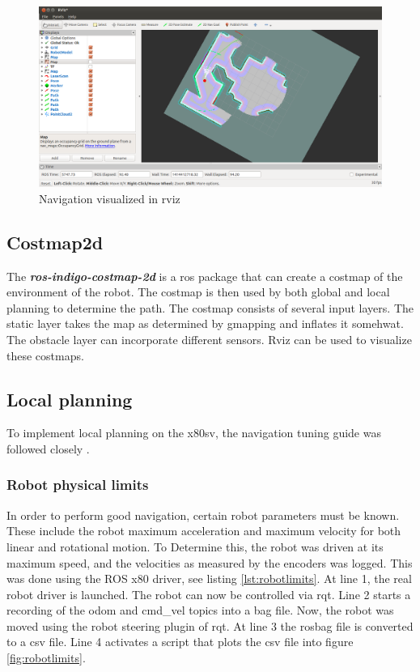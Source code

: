 \documentclass[a4paper]{article}
\newcommand{\rospackage}[1]{\textbf{\textit{ros-indigo-#1}}}
\begin{document}
\begin{figure}[h!]
  \centering
  \includegraphics[width=\textwidth,height=\textheight,keepaspectratio]{img/rviz_navigation2.png}
  \caption{Navigation visualized in rviz}
  \label{fig:navrviz}
\end{figure}

\subsection{Costmap2d}
The \rospackage{costmap-2d} is a ros package that can create a costmap of the environment
of the robot.
The costmap is then used by both global and local planning to determine the path.
The costmap consists of several input layers. The static layer takes the map as determined by
gmapping and inflates it somehwat. The obstacle layer can incorporate different sensors.
Rviz can be used to visualize these costmaps.

\subsection{Local planning}
To implement local planning on the x80sv, the navigation tuning guide was followed closely
\cite{tuningguide}.

\subsubsection{Robot physical limits}
In order to perform good navigation, certain robot parameters must be known. These include the
robot maximum acceleration and maximum velocity for both linear and rotational motion. To
Determine this, the robot was driven at its maximum speed, and the velocities as measured by
the encoders was logged. This was done using the ROS x80 driver, see listing \ref{lst:robotlimits}.
At line 1, the real robot driver is launched. The robot can now be controlled via rqt.
Line 2 starts a recording of the odom and cmd\_vel topics into a bag file. Now, the robot
was moved using the robot steering plugin of rqt. At line 3 the rosbag file is converted to
a csv file. Line 4 activates a script that plots the csv file into figure \ref{fig:robotlimits}.
\end{document}
